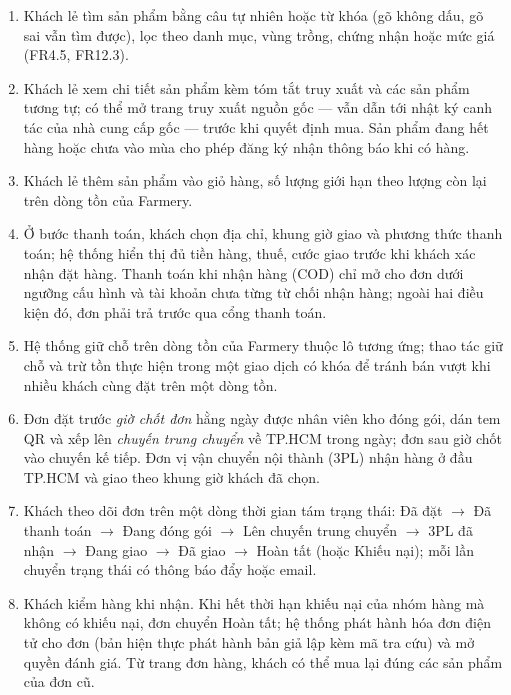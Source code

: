 \begin{enumerate}
    \item Khách lẻ tìm sản phẩm bằng câu tự nhiên hoặc từ khóa (gõ không dấu, gõ sai vẫn tìm được), lọc theo danh mục, vùng trồng, chứng nhận hoặc mức giá (FR4.5, FR12.3).
    \item Khách lẻ xem chi tiết sản phẩm kèm tóm tắt truy xuất và các sản phẩm tương tự; có thể mở trang truy xuất nguồn gốc --- vẫn dẫn tới nhật ký canh tác của nhà cung cấp gốc --- trước khi quyết định mua. Sản phẩm đang hết hàng hoặc chưa vào mùa cho phép đăng ký nhận thông báo khi có hàng.
    \item Khách lẻ thêm sản phẩm vào giỏ hàng, số lượng giới hạn theo lượng còn lại trên dòng tồn của Farmery.
    \item Ở bước thanh toán, khách chọn địa chỉ, khung giờ giao và phương thức thanh toán; hệ thống hiển thị đủ tiền hàng, thuế, cước giao trước khi khách xác nhận đặt hàng. Thanh toán khi nhận hàng (COD) chỉ mở cho đơn dưới ngưỡng cấu hình và tài khoản chưa từng từ chối nhận hàng; ngoài hai điều kiện đó, đơn phải trả trước qua cổng thanh toán.
    \item Hệ thống giữ chỗ trên dòng tồn của Farmery thuộc lô tương ứng; thao tác giữ chỗ và trừ tồn thực hiện trong một giao dịch có khóa để tránh bán vượt khi nhiều khách cùng đặt trên một dòng tồn.
    \item Đơn đặt trước \emph{giờ chốt đơn} hằng ngày được nhân viên kho đóng gói, dán tem QR và xếp lên \emph{chuyến trung chuyển} về TP.HCM trong ngày; đơn sau giờ chốt vào chuyến kế tiếp. Đơn vị vận chuyển nội thành (3PL) nhận hàng ở đầu TP.HCM và giao theo khung giờ khách đã chọn.
    \item Khách theo dõi đơn trên một dòng thời gian tám trạng thái: Đã đặt $\rightarrow$ Đã thanh toán $\rightarrow$ Đang đóng gói $\rightarrow$ Lên chuyến trung chuyển $\rightarrow$ 3PL đã nhận $\rightarrow$ Đang giao $\rightarrow$ Đã giao $\rightarrow$ Hoàn tất (hoặc Khiếu nại); mỗi lần chuyển trạng thái có thông báo đẩy hoặc email.
    \item Khách kiểm hàng khi nhận. Khi hết thời hạn khiếu nại của nhóm hàng mà không có khiếu nại, đơn chuyển Hoàn tất; hệ thống phát hành hóa đơn điện tử cho đơn (bản hiện thực phát hành bản giả lập kèm mã tra cứu) và mở quyền đánh giá. Từ trang đơn hàng, khách có thể mua lại đúng các sản phẩm của đơn cũ.
\end{enumerate}

